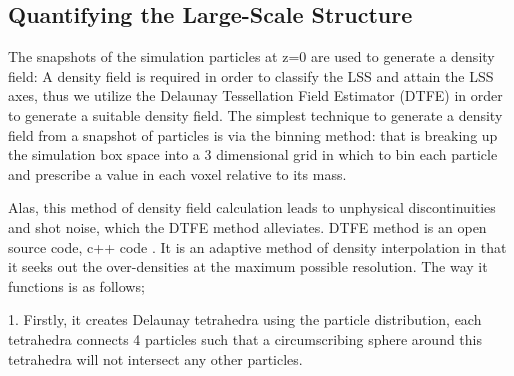 \documentclass[a4paper,fleqn,usenatbib]{mnras}
\begin{document}
\subsection{Quantifying the Large-Scale Structure}

The snapshots of the simulation particles at z=0 are used to generate a density field: A density field is required in order to classify the LSS and attain the LSS axes, thus we utilize  the Delaunay Tessellation Field Estimator (DTFE)  in order to generate a suitable density field. 
The simplest technique to generate a density field from a snapshot of particles is via the binning method: that is breaking up the simulation box space into a 3 dimensional grid in which to bin each particle and prescribe a value in each voxel relative to its mass.

Alas, this method of density field calculation leads to unphysical discontinuities and shot noise, which the DTFE method alleviates.
DTFE method is an open source code, c++ code \citep{Shaap_00,Weygaert_09,Cautun_11}. It is an adaptive method of density interpolation in that it seeks out the over-densities at the maximum possible resolution. The way it functions is as follows;

1. Firstly, it creates Delaunay tetrahedra using the particle distribution, each tetrahedra connects 4 particles such that a circumscribing sphere around this tetrahedra will not intersect any other particles. 
\end{document}
